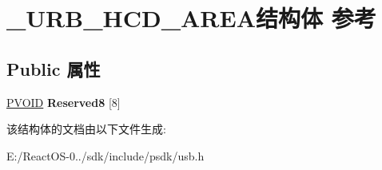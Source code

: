 \hypertarget{struct___u_r_b___h_c_d___a_r_e_a}{}\section{\+\_\+\+U\+R\+B\+\_\+\+H\+C\+D\+\_\+\+A\+R\+E\+A结构体 参考}
\label{struct___u_r_b___h_c_d___a_r_e_a}
\subsection*{Public 属性}
\begin{DoxyCompactItemize}
\item 
\mbox{\label{struct___u_r_b___h_c_d___a_r_e_a_a2b0949ece395b9d18eff29eb97cedb25}} 
\hyperlink{interfacevoid}{P\+V\+O\+ID} {\bfseries Reserved8} \mbox{[}8\mbox{]}
\end{DoxyCompactItemize}


该结构体的文档由以下文件生成\+:\begin{DoxyCompactItemize}
\item 
E\+:/\+React\+O\+S-\/0../sdk/include/psdk/usb.\+h\end{DoxyCompactItemize}
